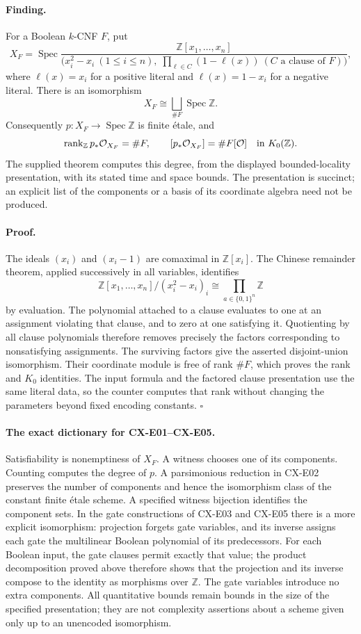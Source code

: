 \documentclass[11pt,a4paper]{article}
\begin{document}
\paragraph{Finding.}
For a Boolean \(k\)-CNF \(F\), put
\[
 X_F=\operatorname{Spec}
 \frac{\mathbb Z[x_1,\ldots,x_n]}
 {\bigl(x_i^2-x_i\ (1\leq i\leq n),\;
     \prod_{\ell\in C}(1-\ell(x))\ (C\text{ a clause of }F)\bigr)},
\]
where \(\ell(x)=x_i\) for a positive literal and
\(\ell(x)=1-x_i\) for a negative literal.
There is an isomorphism
\[
 X_F\cong\bigsqcup_{\#F}\operatorname{Spec}\mathbb Z.
\]
Consequently \(p:X_F\to\operatorname{Spec}\mathbb Z\) is finite étale,
and
\[
 \operatorname{rank}_{\mathbb Z}p_*\mathcal O_{X_F}=\#F,
 \qquad
 [p_*\mathcal O_{X_F}]=\#F[\mathcal O]\quad\hbox{in }K_0(\mathbb Z).
\]
The supplied theorem computes this degree, from the displayed
bounded-locality presentation, with its stated time and space bounds.
The presentation is succinct; an explicit list of the components or
a basis of its coordinate algebra need not be produced.

\paragraph{Proof.}
The ideals \((x_i)\) and \((x_i-1)\) are comaximal in
\(\mathbb Z[x_i]\).
The Chinese remainder theorem, applied successively in all variables,
identifies
\[
 \mathbb Z[x_1,\ldots,x_n]/(x_i^2-x_i)_i
 \cong\prod_{a\in\{0,1\}^n}\mathbb Z
\]
by evaluation.
The polynomial attached to a clause evaluates to one at an assignment
violating that clause, and to zero at one satisfying it.
Quotienting by all clause polynomials therefore removes precisely
the factors corresponding to nonsatisfying assignments.
The surviving factors give the asserted disjoint-union isomorphism.
Their coordinate module is free of rank \(\#F\), which proves the
rank and \(K_0\) identities.
The input formula and the factored clause presentation use the same
literal data, so the counter computes that rank without changing the
parameters beyond fixed encoding constants.
\hfill\(\square\)

\paragraph{The exact dictionary for CX-E01--CX-E05.}
Satisfiability is nonemptiness of \(X_F\).
A witness chooses one of its components.
Counting computes the degree of \(p\).
A parsimonious reduction in CX-E02 preserves the number of components
and hence the isomorphism class of the constant finite étale scheme.
A specified witness bijection identifies the component sets.
In the gate constructions of CX-E03 and CX-E05 there is a more
explicit isomorphism: projection forgets gate variables, and its
inverse assigns each gate the multilinear Boolean polynomial of
its predecessors.
For each Boolean input, the gate clauses permit exactly that value;
the product decomposition proved above therefore shows that the
projection and its inverse compose to the identity as morphisms
over \(\mathbb Z\).
The gate variables introduce no extra components.
All quantitative bounds remain bounds in the size of the specified
presentation; they are not complexity assertions about a scheme
given only up to an unencoded isomorphism.
\end{document}
